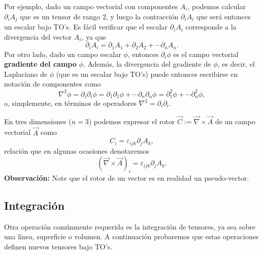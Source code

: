 Por ejemplo, dado un campo vectorial con componentes $A_i$, podemos calcular $\partial_iA_j$ que es un tensor de rango 2, y luego la contracción $\partial_iA_i$ que será entonces un escalar bajo TO's. Es fácil verificar que el escalar $\partial_iA_i$ corresponde a la divergencia del vector $A_i$, ya que
\begin{equation}
\partial_iA_i=\partial_1A_1+\partial_2A_2+\cdots \partial_nA_n.
\end{equation}
Por otro lado, dado un campo escalar $\phi$, entonces $\partial_i\phi$ es el campo vectorial \textbf{gradiente del campo} $\phi$. Además, la divergencia del gradiente de $\phi$, es decir, el Laplaciano de $\phi$ (que es un escalar bajo TO's) puede entonces escribirse en notación de componentes como
\begin{equation}
\nabla^2\phi=\partial_i\partial_i\phi=\partial_1\partial_1\phi+\cdots \partial_n\partial_n\phi=\partial^2_1\phi+\cdots \partial^2_n\phi,
\end{equation}
o, simplemente, en términos de operadores $\nabla^2=\partial_i\partial_i$.

En tres dimensiones ($n=3$) podemos expresar el rotor $\vec{C}:=\vec\nabla\times\vec{A}$ de un campo vectorial $\vec{A}$ como
\begin{equation}
C_i=\varepsilon_{ijk}\partial_jA_k,
\end{equation}
relación que en algunas ocasiones denotaremos 
\begin{equation}
(\vec\nabla\times\vec{A})_i=\varepsilon_{ijk}\partial_jA_k.
\end{equation}
\textbf{Observación:} Note que el rotor de un vector es en realidad un pseudo-vector.

\subsection{Integración}
Otra operación comúnmente requerida es la integración de tensores, ya sea sobre una línea, superficie o volumen. A continuación probaremos que estas operaciones definen nuevos tensores bajo TO's.

